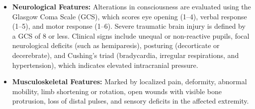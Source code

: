 \begin{itemize}
    \item \textbf{Neurological Features:} Alterations in consciousness are evaluated using the Glasgow Coma Scale (GCS), which scores eye opening (1--4), verbal response (1--5), and motor response (1--6). Severe traumatic brain injury is defined by a GCS of 8 or less. Clinical signs include unequal or non-reactive pupils, focal neurological deficits (such as hemiparesis), posturing (decorticate or decerebrate), and Cushing's triad (bradycardia, irregular respirations, and hypertension), which indicates elevated intracranial pressure.
    \item \textbf{Musculoskeletal Features:} Marked by localized pain, deformity, abnormal mobility, limb shortening or rotation, open wounds with visible bone protrusion, loss of distal pulses, and sensory deficits in the affected extremity.
\end{itemize}

